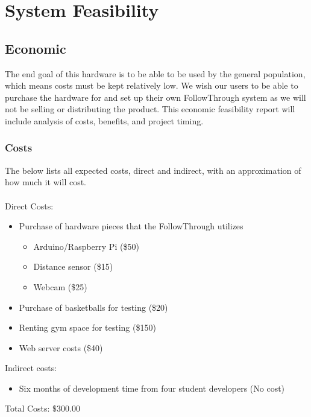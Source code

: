 \chapter{System Feasibility}

\section{Economic}
\hspace*{4mm}The end goal of this hardware is to be able to be used by the general population, which means costs must be kept relatively low. We wish our users to be able to purchase the hardware for and set up their own FollowThrough system as we will not be selling or distributing the product. This economic feasibility report will include analysis of costs, benefits, and project timing.

\subsection{Costs}
The below lists all expected costs, direct and indirect, with an approximation of how much it will cost.\\
\\
Direct Costs:
\begin{itemize}
    \item Purchase of hardware pieces that the FollowThrough utilizes
    \begin{itemize}
        \item Arduino/Raspberry Pi (\$50)
        \item Distance sensor (\$15)
        \item Webcam (\$25)
    \end{itemize}
    \item Purchase of basketballs for testing (\$20)
    \item Renting gym space for testing (\$150)
    \item Web server costs (\$40)
\end{itemize}
Indirect costs:
\begin{itemize}
    \item Six months of development time from four student developers (No cost)
\end{itemize}
Total Costs: $\$300.00$

\newpage
